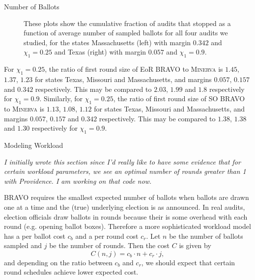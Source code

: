 \documentclass[final]{beamer}
\newcommand{\Minerva}{\textsc{Minerva}\xspace}
\newcommand{\BRAVO}{\textsc{BRAVO}\xspace}
\newlength{\colwidth}
\begin{document}
\begin{frame}[t]
\begin{columns}[t]
\begin{column}{\colwidth}
\begin{block}{Number of Ballots}
\begin{figure}[h]
\begin{minipage}{.49\textwidth}
\begin{centering}
\label{fig:texas_90}
\end{centering}
\end{minipage}
\caption{These plots show the cumulative fraction of audits that stopped as a function of average number of sampled ballots for all four audits we studied, for the states Massachusetts (left) with margin $0.342$ and $\chi_1=0.25$ and Texas (right) with margin $0.057$ and $\chi_1=0.9$.}
\end{figure}

For $\chi_1=0.25$, the ratio of first round size of EoR \BRAVO to \Minerva is $1.45$, $1.37$, $1.23$ for states Texas, Missouri and Massachusetts, and margins $0.057$, $0.157$ and $0.342$ respectively. This may be compared to $2.03$, $1.99$ and $1.8$ respectively for $\chi_1=0.9$. Similarly, for $\chi_1=0.25$, the ratio of first round size of SO \BRAVO to \Minerva is $1.13$, $1.08$, $1.12$ for states Texas, Missouri and Massachusetts, and margins $0.057$, $0.157$ and $0.342$ respectively. This may be compared to $1.38$, $1.38$ and $1.30$ respectively for $\chi_1=0.9$. 


\end{block}


\begin{block}{Modeling Workload}

\emph{I initially wrote this section since I'd really like to have some evidence that for certain workload parameters, we see an optimal
number of rounds greater than 1 with Providence. I am working on that code now.}

\BRAVO requires the smallest expected number of ballots when ballots are drawn one at a time and the (true) underlying election is as announced. 
In real audits, election officials draw ballots in rounds because their is some overhead with each round (e.g. opening ballot boxes).
Therefore a more sophisticated workload model has a per ballot cost $c_b$ and a per round cost $c_r$. 
Let $n$ be the number of ballots sampled and $j$ be the number of rounds. Then the cost $C$ is given by 
$$C(n,j) = c_b\cdot n + c_r\cdot j,$$
and depending on the ratio between $c_b$ and $c_r$, we should expect that certain round schedules
achieve lower expected cost.
\end{block}


\end{column}
\end{columns}
\end{frame}
\end{document}
